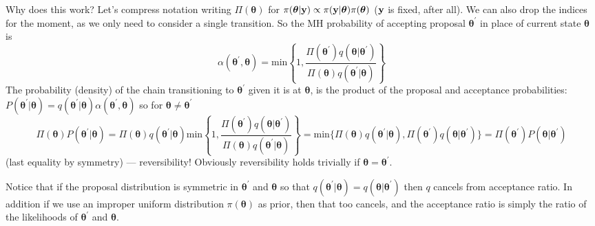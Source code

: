 \documentclass[10pt] {article}
\theoremstyle{definition}
\begin{document}
\noindent Why does this work? Let's compress notation writing $\Pi({\bm \theta})$ for $\pi({\bm \theta}|{\bf y}) \propto \pi({\bf y}|{\bm \theta})\pi({\bm \theta})$ ($\bf y$ is fixed, after all). We can also drop the indices for the moment, as we only need to consider a single transition.
So the MH probability of accepting proposal ${\bm \theta}^\prime$ in place of current state ${\bm \theta}$ is 
$$
\alpha({\bm \theta}^\prime,{\bm \theta}) = \text{min} \left \{1, 
\frac{\Pi({\bm \theta}^\prime)q({\bm \theta}|{\bm \theta}^\prime)}{ \Pi({\bm \theta})q({\bm \theta}^\prime|{\bm \theta})}
\right \}
$$
The probability (density) of the chain transitioning to ${\bm \theta}^\prime$ given it is at ${\bm \theta}$, is the product of the proposal and acceptance probabilities:  $P({\bm \theta}^\prime|{\bm \theta}) = q({\bm \theta}^\prime|{\bm \theta})\alpha({\bm \theta}^\prime,{\bm \theta})$ so for ${\bm \theta} \ne {\bm \theta}^\prime$
$$
\Pi({\bm \theta})P({\bm \theta}^\prime|{\bm \theta}) = \Pi({\bm \theta})q({\bm \theta}^\prime|{\bm \theta})\text{min} \left \{1,\frac{ 
\Pi({\bm \theta}^\prime)q({\bm \theta}|{\bm \theta}^\prime)}{ \Pi({\bm \theta})q({\bm \theta}^\prime|{\bm \theta}) } \right \}  = \text{min} \{ \Pi({\bm \theta})q({\bm \theta}^\prime|{\bm \theta}),
\Pi({\bm \theta}^\prime)q({\bm \theta}|{\bm \theta}^\prime) \} = \Pi({\bm \theta}^\prime)P({\bm \theta}|{\bm \theta}^\prime)
$$
(last equality by symmetry) --- reversibility! Obviously reversibility holds trivially if ${\bm \theta} ={\bm \theta}^\prime$.

Notice that if the proposal distribution is symmetric in ${\bm \theta}^\prime $ and ${\bm \theta} $ so that $q({\bm \theta}^\prime|{\bm \theta}) = q({\bm \theta}|{\bm \theta}^\prime) $ then $q$ cancels from acceptance ratio. In addition if we use an improper uniform distribution $\pi({\bm \theta})$ as prior, then that too cancels, and the acceptance ratio is simply the ratio of the likelihoods of ${\bm \theta}^\prime $ and ${\bm \theta}$. 
\end{document}
